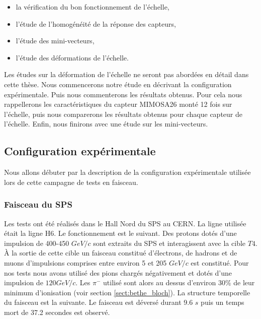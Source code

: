   \medskip
  
  \renewcommand{\labelitemi}{$\bullet$}
  
  \begin{itemize}
   \item la v\'erification du bon fonctionnement de l'\'echelle,
   \item l'étude de l'homog\'en\'eit\'e de la r\'eponse des capteurs,
   \item l'\'etude des mini-vecteurs,
   \item l'\'etude des d\'eformations de l'\'echelle.
  \end{itemize}

  \medskip

  Les \'etudes sur la d\'eformation de l'\'echelle ne seront pas abord\'ees en d\'etail dans cette th\`ese. Nous commencerons notre \'etude en d\'ecrivant la configuration exp\'erimentale. Puis nous commenterons les r\'esultats obtenus. Pour cela nous rappellerons les caract\'eristiques du capteur MIMOSA26 mont\'e 12 fois sur l'\'echelle, puis nous comparerons les r\'esultats obtenus pour chaque capteur de l'\'echelle. Enfin, nous finirons avec une \'etude sur les mini-vecteurs.
  
  \subsection{Configuration exp\'erimentale}
 
   Nous allons d\'ebuter par la description de la configuration exp\'erimentale utilis\'ee lors de cette campagne de tests en faisceau.
   
  \subsubsection{Faisceau du SPS}
  
  Les tests ont \'et\'e r\'ealis\'es dans le Hall Nord du SPS au CERN. La ligne utilis\'ee \'etait la ligne H6. Le fonctionnement est le suivant. Des protons dot\'es d'une impulsion de 400-450 $GeV/c$ sont extraits du SPS et interagissent avec la cible $T4$. \`A la sortie de cette cible un faisceau constitu\'e d'\'electrons, de hadrons et de muons d'impulsions comprises entre environ 5 et 205 $GeV/c$ est constitu\'e. Pour nos tests nous avons utilis\'e des pions charg\'es n\'egativement et dot\'es d'une impulsion de $120 GeV/c$. Les $\pi^-$ utilis\'e sont alors au dessus d'environ $30\%$ de leur minimum d'ionisation (voir section \ref{sect:bethe_bloch}). La structure temporelle du faisceau est la suivante. Le faisceau est d\'evers\'e durant 9.6 $s$ puis un temps mort de 37.2 secondes est observ\'e.
  
